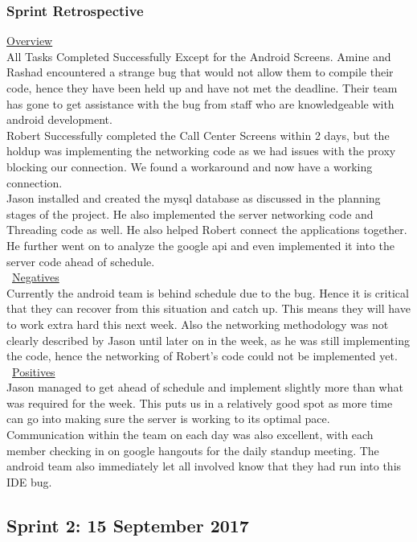 \documentclass[a4paper,12pt]{article}
\begin{document}
\subsubsection{Sprint Retrospective}
\underline{Overview}\\
All Tasks Completed Successfully Except for the Android Screens. Amine and Rashad encountered a strange bug that would not allow them to compile their code, hence they have been held up and have not met the deadline. Their team has gone to get assistance with the bug from staff who are knowledgeable with android development. \\ Robert Successfully completed the Call Center Screens within 2 days, but the holdup was implementing the networking code as we had issues with the proxy blocking our connection. We found a workaround and now have a working connection. \\ Jason installed and created the mysql database as discussed in the planning stages of the project. He also implemented the server networking code and Threading code as well. He also helped Robert connect the applications together. He further went on to analyze the google api and even implemented it into the server code ahead of schedule.\\\
\underline{Negatives}\\
Currently the android team is behind schedule due to the bug. Hence it is critical that they can recover from this situation and catch up. This means they will have to work extra hard this next week. Also the networking methodology was not clearly described by Jason until later on in the week, as he was still implementing the code, hence the networking of Robert's code could not be implemented yet. \\\
\underline{Positives}\\
Jason managed to get ahead of schedule and implement slightly more than what was required for the week. This puts us in a relatively good spot as more time can go into making sure the server is working to its optimal pace. Communication within the team on each day was also excellent, with each member checking in on google hangouts for the daily standup meeting. The android team also immediately let all involved know that they had run into this IDE bug. 

\newpage

\subsection{Sprint 2: 15 September 2017}
\end{document}
